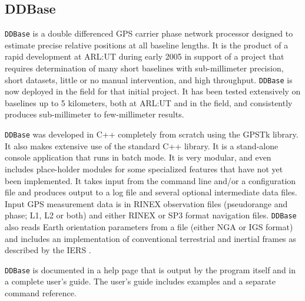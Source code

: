 \documentclass{ion-gps}
\newcommand{\gpstkapplication}[1]{\texttt{#1}}
\begin{document}
\subsection*{DDBase}

\gpstkapplication{DDBase} is a double differenced GPS carrier phase
network processor designed to estimate precise relative positions at
all baseline lengths. It is the product of a rapid development at
ARL:UT during early 2005 in support of a project that requires
determination of many short baselines with sub-millimeter precision,
short datasets, little or no manual intervention, and high
throughput. \gpstkapplication{DDBase} is now deployed in the field for
that initial project\cite{ion:gstss06}. It has been tested extensively
on baselines up to 5 kilometers, both at ARL:UT and in the field, and
consistently produces sub-millimeter to few-millimeter results.

\gpstkapplication{DDBase} was developed in C++ completely from scratch
using the GPSTk library. It also makes extensive use of the standard
C++ library. It is a stand-alone console application that runs in
batch mode. It is very modular, and even includes place-holder
modules for some specialized features that have not yet been
implemented. It takes input from the command line and/or a
configuration file and produces output to a log file and several
optional intermediate data files. Input GPS measurement data is in
RINEX observation files (pseudorange and phase; L1, L2 or both) and
either RINEX or SP3 format navigation
files. \gpstkapplication{DDBase} also reads Earth orientation
parameters from a file (either NGA or IGS format) and includes an
implementation of conventional terrestrial and inertial frames as described by the IERS
\cite[Chapter 5]{iersconventions}.

\gpstkapplication{DDBase} is documented in a help page that is
output by the program itself and in a complete user's guide.
The user's guide includes examples and a separate command reference. 
\end{document}
